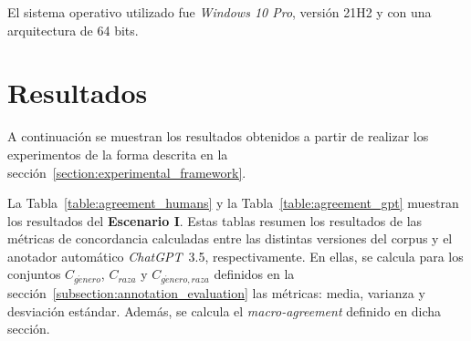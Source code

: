 El sistema operativo utilizado fue \emph{Windows 10 Pro}, versi\'on 21H2 y con una arquitectura de 64 bits.

\section{Resultados}
A continuaci\'on se muestran los resultados obtenidos a partir de realizar los experimentos de la forma descrita en la 
secci\'on~\ref{section:experimental_framework}.

La Tabla~\ref{table:agreement_humans} y la Tabla~\ref{table:agreement_gpt} muestran los resultados del \textbf{Escenario I}.
Estas tablas resumen los resultados de las m\'etricas de concordancia calculadas entre las distintas
versiones del corpus y el anotador autom\'atico \emph{ChatGPT}~3.5, respectivamente. En ellas, se 
calcula para los conjuntos $C_{g\acute{e}nero}$, $C_{raza}$ y $C_{g\acute{e}nero, raza}$ definidos
en la secci\'on~\ref{subsection:annotation_evaluation} las m\'etricas: media, varianza y desviaci\'on
est\'andar. Adem\'as, se calcula el \emph{macro-agreement} definido en dicha secci\'on.


